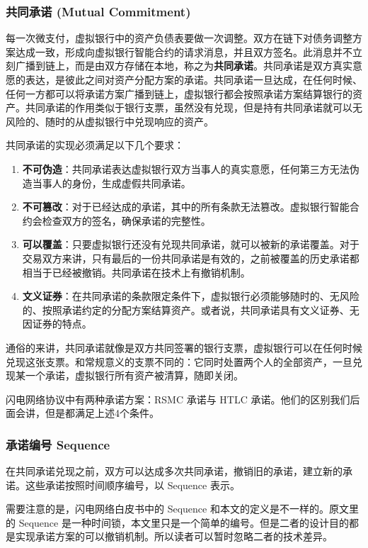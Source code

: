 \subsubsection{共同承诺 (Mutual Commitment)} \label{sec:commiment}
每一次微支付，虚拟银行中的资产负债表要做一次调整。双方在链下对债务调整方案达成一致，形成向虚拟银行智能合约的请求消息，并且双方签名。此消息并不立刻广播到链上，而是由双方存储在本地，称之为\textbf{共同承诺}。共同承诺是双方真实意愿的表达，是彼此之间对资产分配方案的承诺。共同承诺一旦达成，在任何时候、任何一方都可以将承诺方案广播到链上，虚拟银行都会按照承诺方案结算银行的资产。共同承诺的作用类似于银行支票，虽然没有兑现，但是持有共同承诺就可以无风险的、随时的从虚拟银行中兑现响应的资产。

共同承诺的实现必须满足以下几个要求：

\begin{enumerate}
    \item \textbf{不可伪造}：共同承诺表达虚拟银行双方当事人的真实意愿，任何第三方无法伪造当事人的身份，生成虚假共同承诺。
    \item \textbf{不可篡改}：对于已经达成的承诺，其中的所有条款无法篡改。虚拟银行智能合约会检查双方的签名，确保承诺的完整性。
    \item \textbf{可以覆盖}：只要虚拟银行还没有兑现共同承诺，就可以被新的承诺覆盖。对于交易双方来讲，只有最后的一份共同承诺是有效的，之前被覆盖的历史承诺都相当于已经被撤销。共同承诺在技术上有撤销机制。
    \item \textbf{文义证券}：在共同承诺的条款限定条件下，虚拟银行必须能够随时的、无风险的、按照承诺约定的分配方案结算资产。或者说，共同承诺具有文义证券、无因证券的特点。
\end{enumerate}

通俗的来讲，共同承诺就像是双方共同签署的银行支票，虚拟银行可以在任何时候兑现这张支票。和常规意义的支票不同的：它同时处置两个人的全部资产，一旦兑现某一个承诺，虚拟银行所有资产被清算，随即关闭。

闪电网络协议中有两种承诺方案：RSMC 承诺与 HTLC 承诺。他们的区别我们后面会讲，但是都满足上述4个条件。

\subsubsection{承诺编号 Sequence}
在共同承诺兑现之前，双方可以达成多次共同承诺，撤销旧的承诺，建立新的承诺。这些承诺按照时间顺序编号，以 Sequence 表示。

需要注意的是，闪电网络白皮书中的 Sequence 和本文的定义是不一样的。原文里的 Sequence 是一种时间锁，本文里只是一个简单的编号。但是二者的设计目的都是实现承诺方案的可以撤销机制。所以读者可以暂时忽略二者的技术差异。


